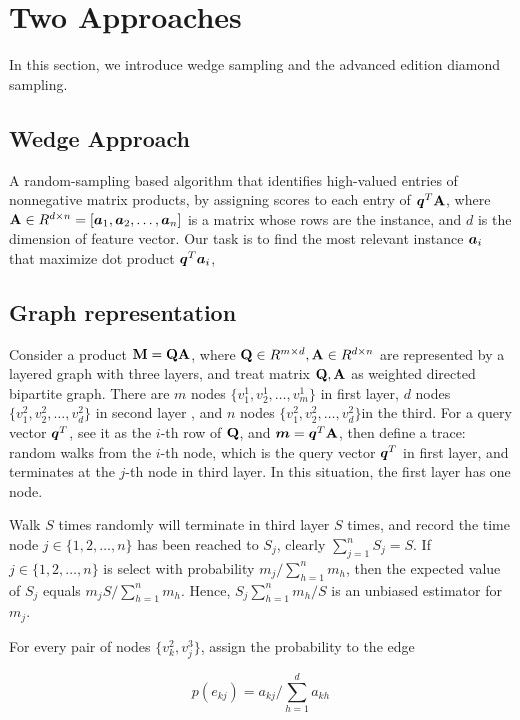 \documentclass{article}
\newcommand{\V}[1]{{\bm{{\MakeLowercase{#1}}}}}%
\newcommand{\M}[1]{{\bm{\mathbf{\MakeUppercase{#1}}}}}%
\begin{document}
\section{Two Approaches}
In this section, we introduce wedge sampling and the advanced edition diamond sampling.
\subsection{Wedge Approach}
A random-sampling based algorithm that identifies high-valued entries of nonnegative matrix products, by assigning scores to each entry of $\V{q}^T\M{A}$, where $\M{A}\in R^{d\times n}=[\V{a}_1,\V{a}_2,\ldots,\V{a}_n]$ is a matrix whose rows are the instance, and $d$ is the dimension of feature vector. Our task is to find the most relevant instance $\V{a}_i$ that maximize dot product $\V{q}^T\V{a}_i$,
\subsection{Graph representation}

Consider a product $\M{m} = \M{q}\M{A}$, where $\M{q}\in R^{m\times d},\M{A}\in R^{d\times n}$ are represented by a layered graph with three layers, and treat matrix $\M{q},\M{A}$ as weighted directed bipartite graph. There are $m$ nodes $\{v_1^1,v_2^1,\ldots,v_m^1\}$ in first layer, $d$ nodes $\{v_1^2,v_2^2,\ldots,v_d^2\}$ in second layer  , and $n$ nodes $\{v_1^2,v_2^2,\ldots,v_d^2\}$in the third. For a query vector $\V{q}^T$, see it as the $i$-th row of $\M{Q}$, and $\V{m} = \V{q}^T\M{A}$, then define a trace: random walks from the $i$-th node, which is the query vector $\V{q}^T$ in first layer, and terminates at the $j$-th node in third layer. In this situation, the first layer has one node.

Walk $S$ times randomly will terminate in third layer $S$ times, and record the time node $j\in\{1,2,\ldots,n\}$ has been reached to $S_j$, clearly $\sum_{j=1}^{n}S_j = S$. If $j\in\{1,2,\ldots,n\}$ is select with probability $m_j/\sum_{h=1}^{n}m_h $, then the expected value of $S_j$ equals $m_jS/\sum_{h=1}^{n}m_h$. Hence, $S_j\sum_{h=1}^{n}m_h/S$ is an unbiased estimator for $m_j$.

For every pair of nodes $\{v_k^2,v_j^3\}$, assign the probability to the edge

\[p(e_{kj}) = a_{kj}/\sum_{h=1}^{d}a_{kh}\]
\end{document}
